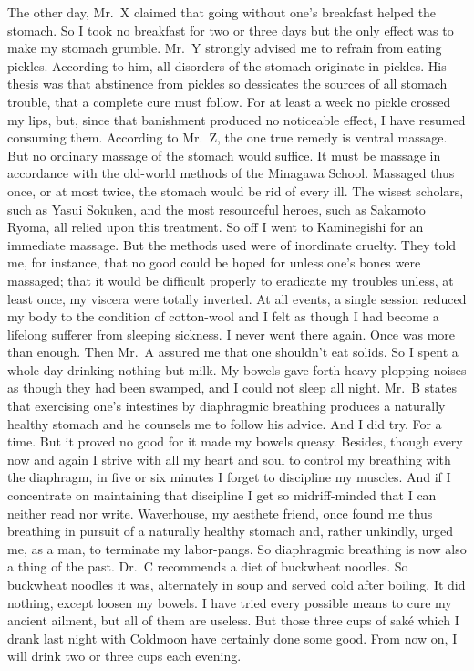 \documentclass[12pt, openright]{book}
\begin{document}
The other day, Mr.~X claimed that going without one's breakfast helped
the stomach. So I took no breakfast for two or three days but the only
effect was to make my stomach grumble. Mr.~Y strongly advised me to
refrain from eating pickles. According to him, all disorders of the
stomach originate in pickles. His thesis was that abstinence from
pickles so dessicates the sources of all stomach trouble, that a
complete cure must follow. For at least a week no pickle crossed my
lips, but, since that banishment produced no noticeable effect, I have
resumed consuming them. According to Mr.~Z, the one true remedy is
ventral massage. But no ordinary massage of the stomach would suffice.
It must be massage in accordance with the old-world methods of the
Minagawa School. Massaged thus once, or at most twice, the stomach would
be rid of every ill. The wisest scholars, such as Yasui Sokuken, and the
most resourceful heroes, such as Sakamoto Ryoma, all relied upon this
treatment. So off I went to Kaminegishi for an immediate massage. But
the methods used were of inordinate cruelty. They told me, for instance,
that no good could be hoped for unless one's bones were massaged; that
it would be difficult properly to eradicate my troubles unless, at least
once, my viscera were totally inverted. At all events, a single session
reduced my body to the condition of cotton-wool and I felt as though I
had become a lifelong sufferer from sleeping sickness. I never went
there again. Once was more than enough. Then Mr.~A assured me that one
shouldn't eat solids. So I spent a whole day drinking nothing but milk.
My bowels gave forth heavy plopping noises as though they had been
swamped, and I could not sleep all night. Mr.~B states that exercising
one's intestines by diaphragmic breathing produces a naturally healthy
stomach and he counsels me to follow his advice. And I did try. For a
time. But it proved no good for it made my bowels queasy. Besides,
though every now and again I strive with all my heart and soul to
control my breathing with the diaphragm, in five or six minutes I forget
to discipline my muscles. And if I concentrate on maintaining that
discipline I get so midriff-minded that I can neither read nor write.
Waverhouse, my aesthete friend, once found me thus breathing in pursuit
of a naturally healthy stomach and, rather unkindly, urged me, as a man,
to terminate my labor-pangs. So diaphragmic breathing is now also a
thing of the past. Dr.~C recommends a diet of buckwheat noodles. So
buckwheat noodles it was, alternately in soup and served cold after
boiling. It did nothing, except loosen my bowels. I have tried every
possible means to cure my ancient ailment, but all of them are useless.
But those three cups of saké which I drank last night with Coldmoon have
certainly done some good. From now on, I will drink two or three cups
each evening.
\end{document}
